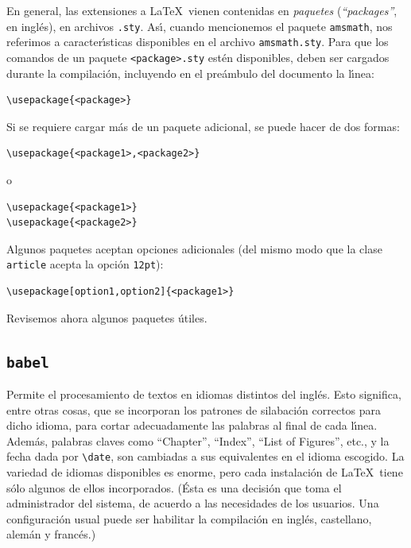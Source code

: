 {En general, las extensiones a \LaTeX\ vienen contenidas en {\em
  paquetes\/} ({\em ``packages''}, en ingl\'es), en archivos
\verb+.sty+. As\'{\i}, cuando mencionemos el paquete \verb+amsmath+,
nos referimos a caracter\'{\i}sticas disponibles en el archivo
\verb+amsmath.sty+. Para que los comandos de un paquete
\verb+<package>.sty+ est\'en disponibles, deben ser cargados durante
la compilaci\'on, incluyendo en el pre\'ambulo del documento la
l\'{\i}nea:

\begin{verbatim}
\usepackage{<package>}
\end{verbatim}


Si se requiere cargar m\'as de un paquete adicional, se puede hacer de
dos formas:

\begin{verbatim}
\usepackage{<package1>,<package2>}
\end{verbatim}
o
\begin{verbatim}
\usepackage{<package1>}
\usepackage{<package2>}
\end{verbatim}

Algunos paquetes aceptan opciones adicionales (del mismo modo que la
clase \verb+article+ acepta la opci\'on \verb+12pt+):

\begin{verbatim}
\usepackage[option1,option2]{<package1>}
\end{verbatim}

Revisemos ahora algunos paquetes \'utiles.

\subsection{{\tt babel}}

Permite el procesamiento de textos en idiomas distintos del
ingl\'es. Esto significa, entre otras cosas, que se incorporan los patrones de
silabaci\'on correctos para dicho idioma, para cortar adecuadamente
las palabras al final de cada l\'{\i}nea. Adem\'as, palabras claves
como ``Chapter'', ``Index'', ``List of Figures'', etc., y la fecha
dada por \verb+\date+, son cambiadas a sus equivalentes en el idioma
escogido. La variedad de idiomas disponibles es enorme, pero cada
instalaci\'on de \LaTeX\ tiene s\'olo algunos de ellos
incorporados. (\'Esta es una decisi\'on que toma el administrador del
sistema, de acuerdo a las necesidades de los usuarios. Una configuraci\'on
usual puede ser habilitar la compilaci\'on en ingl\'es, castellano,
alem\'an y franc\'es.)  

}
